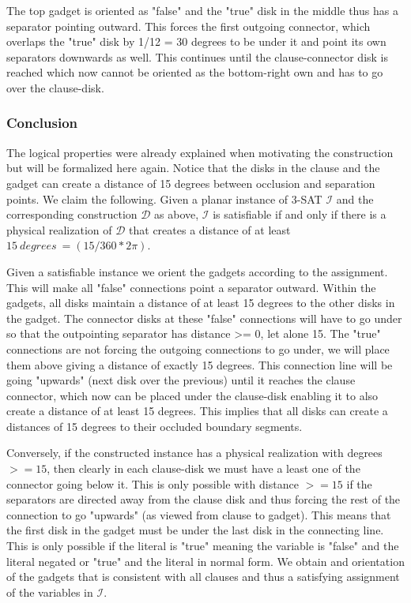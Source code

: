 \documentclass[a4paper,11pt]{article}
\begin{document}
The top gadget is oriented as "false" and the "true" disk in the middle thus has a separator pointing outward. This forces the first outgoing connector, which overlaps the "true" disk by 1/12 = 30 degrees to be under it and point its own separators downwards as well. This continues until the clause-connector disk is reached which now cannot be oriented as the bottom-right own and has to go over the clause-disk.

\subsubsection{Conclusion}
The logical properties were already explained when motivating the construction but will be formalized here again. Notice that the disks in the clause and the gadget can create a distance of 15 degrees between occlusion and separation points. We claim the following.
Given a planar instance of 3-SAT $\mathcal{I}$ and the corresponding construction $\mathcal{D}$ as above, $\mathcal{I}$ is satisfiable if and only if there is a physical realization of $\mathcal{D}$ that creates a distance of at least $15\ degrees\ =  (15/360 * 2\pi)$.

Given a satisfiable instance we orient the gadgets according to the assignment. This will make all "false" connections point a separator outward. Within the gadgets, all disks maintain a distance of at least 15 degrees to the other disks in the gadget. The connector disks at these "false" connections will have to go under so that the outpointing separator has distance >= 0, let alone 15. The "true" connections are not forcing the outgoing connections to go under, we will place them above giving a distance of exactly 15 degrees. This connection line will be going "upwards" (next disk over the previous) until it reaches the clause connector, which now can be placed under the clause-disk enabling it to also create a distance of at least 15 degrees.
This implies that all disks can create a distances of 15 degrees to their occluded boundary segments.

Conversely, if the constructed instance has a physical realization with degrees $>= 15$, then clearly in each clause-disk we must have a least one of the connector going below it. This is only possible with distance $>= 15$ if the separators are directed away from the clause disk and thus forcing the rest of the connection to go "upwards" (as viewed from clause to gadget). This means that the first disk in the gadget must be under the last disk in the connecting line. This is only possible if the literal is "true" meaning the variable is "false" and the literal negated or "true" and the literal in normal form. We obtain and orientation of the gadgets that is consistent with all clauses and thus a satisfying assignment of the variables in $\mathcal{I}$.
\end{document}
